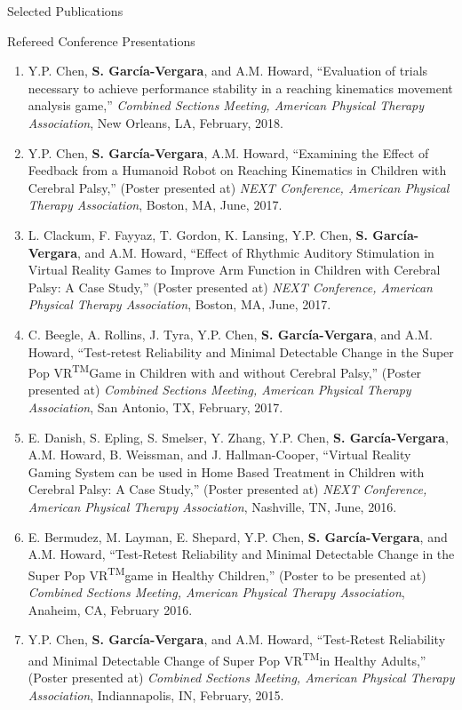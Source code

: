 \documentclass{resume} %
\newcommand{\Sergio}{\textbf{S. Garc\'{i}a-Vergara}}
\newcommand{\SuperPop}{Super Pop VR\textsuperscript{TM}\space}
\begin{document}
\begin{rSection}{Selected Publications}
\begin{rSubsection}{Refereed Conference Presentations}{}{}{}
\begin{enumerate}
\item Y.P. Chen, \Sergio, and A.M. Howard, ``Evaluation of trials necessary to
  achieve performance stability in a reaching kinematics movement analysis
  game,'' \textit{Combined Sections Meeting, American Physical Therapy
    Association}, New Orleans, LA, February, 2018.

\item Y.P. Chen, \Sergio, A.M. Howard, ``Examining the Effect of Feedback from a
  Humanoid Robot on Reaching Kinematics in Children with Cerebral Palsy,''
  (Poster presented at) \textit{NEXT Conference, American Physical Therapy
    Association}, Boston, MA, June, 2017.

\item L. Clackum, F. Fayyaz, T. Gordon, K. Lansing, Y.P. Chen, \Sergio, and
  A.M. Howard, ``Effect of Rhythmic Auditory Stimulation in Virtual Reality
  Games to Improve Arm Function in Children with Cerebral Palsy: A Case Study,''
  (Poster presented at) \textit{NEXT Conference, American Physical Therapy
    Association}, Boston, MA, June, 2017.

\item C. Beegle, A. Rollins, J. Tyra, Y.P. Chen, \Sergio, and A.M. Howard,
  ``Test-retest Reliability and Minimal Detectable Change in the \SuperPop Game
  in Children with and without Cerebral Palsy,'' (Poster presented at)
  \textit{Combined Sections Meeting, American Physical Therapy Association}, San
  Antonio, TX, February, 2017.

\item E. Danish, S. Epling, S. Smelser, Y. Zhang, Y.P. Chen, \Sergio,
  A.M. Howard, B. Weissman, and J. Hallman-Cooper, ``Virtual Reality Gaming
  System can be used in Home Based Treatment in Children with Cerebral Palsy: A
  Case Study,'' (Poster presented at) \textit{NEXT Conference, American Physical
    Therapy Association}, Nashville, TN, June, 2016.

\item E. Bermudez, M. Layman, E. Shepard, Y.P. Chen, \Sergio, and A.M. Howard,
  ``Test-Retest Reliability and Minimal Detectable Change in the \SuperPop game
  in Healthy Children,'' (Poster to be presented at) \textit{Combined Sections
    Meeting, American Physical Therapy Association}, Anaheim, CA, February 2016.

\item Y.P. Chen, \Sergio, and A.M. Howard, ``Test-Retest Reliability and Minimal
  Detectable Change of \SuperPop in Healthy Adults,'' (Poster presented at)
  \textit{Combined Sections Meeting, American Physical Therapy Association},
  Indiannapolis, IN, February, 2015.


\end{enumerate}
\end{rSubsection}
\end{rSection}
\end{document}
